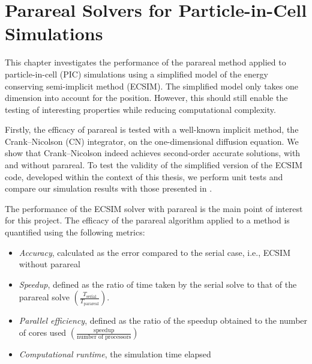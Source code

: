 \chapter{Parareal Solvers for Particle-in-Cell Simulations}
\label{cha: methods and results}


This chapter investigates the performance of the parareal method applied to particle-in-cell (PIC) simulations using a simplified model of the energy conserving semi-implicit method (ECSIM). The simplified model only takes one dimension into account for the position. However, this should still enable the testing of interesting properties while reducing computational complexity.

Firstly, the efficacy of parareal is tested with a well-known implicit method, the Crank--Nicolson (CN) integrator, on the one-dimensional diffusion equation. We show that Crank--Nicolson indeed achieves second-order accurate solutions, with and without parareal. To test the validity of the simplified version of the ECSIM code, developed within the context of this thesis, we perform unit tests and compare our simulation results with those presented in \cite{lapenta_exactly_2017,lapenta_advances_2023}. 

The performance of the ECSIM solver with parareal is the main point of interest for this project.
 The efficacy of the parareal algorithm applied to a method is quantified using the following metrics:
 \begin{itemize}
    
    \item \textit{Accuracy}, calculated as the error compared to the serial case, i.e., ECSIM without parareal
    
    \item \textit{Speedup}, defined as the ratio of time taken by the serial solve to that of the parareal solve $\left(\frac{T_\mathrm{serial}}{T_\mathrm{parareal}}\right)$.
    
    \item \textit{Parallel efficiency}, defined as the ratio of the speedup obtained to the number of cores used $\left(\frac{\text{speedup}}{\text{number of processors}}\right)$
    
    \item \textit{Computational runtime}, the simulation time elapsed
 
 \end{itemize}

